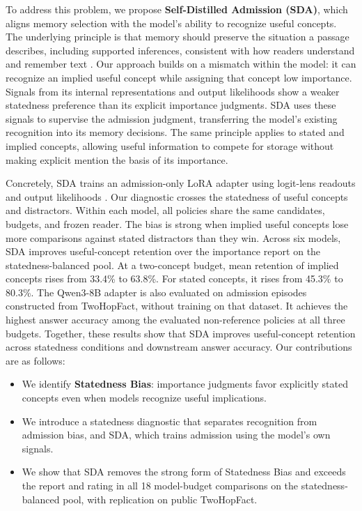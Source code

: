 To address this problem, we propose \textbf{Self-Distilled Admission (SDA)}, which aligns memory selection with the model's ability to recognize useful concepts. The underlying principle is that memory should preserve the situation a passage describes, including supported inferences, consistent with how readers understand and remember text \citep{bransford1972sentence,kintsch1988construction}. Our approach builds on a mismatch within the model: it can recognize an implied useful concept while assigning that concept low importance. Signals from its internal representations and output likelihoods show a weaker statedness preference than its explicit importance judgments. SDA uses these signals to supervise the admission judgment, transferring the model's existing recognition into its memory decisions. The same principle applies to stated and implied concepts, allowing useful information to compete for storage without making explicit mention the basis of its importance.

Concretely, SDA trains an admission-only LoRA adapter using logit-lens readouts and output likelihoods \citep{hu2021lora}. Our diagnostic crosses the statedness of useful concepts and distractors. Within each model, all policies share the same candidates, budgets, and frozen reader. The bias is strong when implied useful concepts lose more comparisons against stated distractors than they win. Across six models, SDA improves useful-concept retention over the importance report on the statedness-balanced pool. At a two-concept budget, mean retention of implied concepts rises from 33.4\% to 63.8\%. For stated concepts, it rises from 45.3\% to 80.3\%. The Qwen3-8B adapter is also evaluated on admission episodes constructed from TwoHopFact, without training on that dataset. It achieves the highest answer accuracy among the evaluated non-reference policies at all three budgets. Together, these results show that SDA improves useful-concept retention across statedness conditions and downstream answer accuracy. Our contributions are as follows:
\begin{itemize}
\item We identify \textbf{Statedness Bias}: importance judgments favor explicitly stated concepts even when models recognize useful implications.
\item We introduce a statedness diagnostic that separates recognition from admission bias, and SDA, which trains admission using the model's own signals.
\item We show that SDA removes the strong form of Statedness Bias and exceeds the report and rating in all 18 model-budget comparisons on the statedness-balanced pool, with replication on public TwoHopFact.
\end{itemize}

